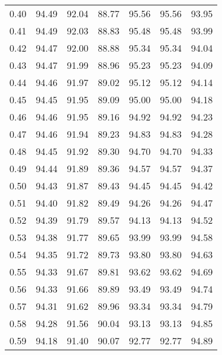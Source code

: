 \begin{tabular}{|c|c|c|c|c|c|c|}
      0.40 &     94.49 &     92.04 &      88.77 &   95.56 &      95.56 &         93.95 \\
      0.41 &     94.49 &     92.03 &      88.83 &   95.48 &      95.48 &         93.99 \\
      0.42 &     94.47 &     92.00 &      88.88 &   95.34 &      95.34 &         94.04 \\
      0.43 &     94.47 &     91.99 &      88.96 &   95.23 &      95.23 &         94.09 \\
      0.44 &     94.46 &     91.97 &      89.02 &   95.12 &      95.12 &         94.14 \\
      0.45 &     94.45 &     91.95 &      89.09 &   95.00 &      95.00 &         94.18 \\
      0.46 &     94.46 &     91.95 &      89.16 &   94.92 &      94.92 &         94.23 \\
      0.47 &     94.46 &     91.94 &      89.23 &   94.83 &      94.83 &         94.28 \\
      0.48 &     94.45 &     91.92 &      89.30 &   94.70 &      94.70 &         94.33 \\
      0.49 &     94.44 &     91.89 &      89.36 &   94.57 &      94.57 &         94.37 \\
      0.50 &     94.43 &     91.87 &      89.43 &   94.45 &      94.45 &         94.42 \\
      0.51 &     94.40 &     91.82 &      89.49 &   94.26 &      94.26 &         94.47 \\
      0.52 &     94.39 &     91.79 &      89.57 &   94.13 &      94.13 &         94.52 \\
      0.53 &     94.38 &     91.77 &      89.65 &   93.99 &      93.99 &         94.58 \\
      0.54 &     94.35 &     91.72 &      89.73 &   93.80 &      93.80 &         94.63 \\
      0.55 &     94.33 &     91.67 &      89.81 &   93.62 &      93.62 &         94.69 \\
      0.56 &     94.33 &     91.66 &      89.89 &   93.49 &      93.49 &         94.74 \\
      0.57 &     94.31 &     91.62 &      89.96 &   93.34 &      93.34 &         94.79 \\
      0.58 &     94.28 &     91.56 &      90.04 &   93.13 &      93.13 &         94.85 \\
      0.59 &     94.18 &     91.40 &      90.07 &   92.77 &      92.77 &         94.89 \\

\end{tabular}
